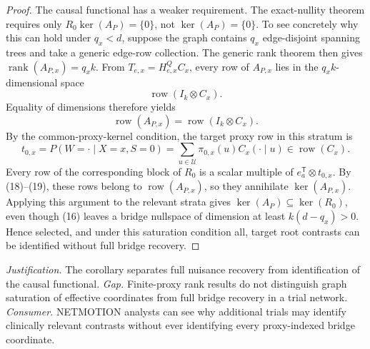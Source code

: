 \documentclass{article}
\begin{document}
\begin{proof}
The causal functional has a weaker requirement.  The exact-nullity theorem requires only \(R_0\ker(A_P)=\{0\}\), not \(\ker(A_P)=\{0\}\).  To see concretely why this can hold under \(q_x<d\), suppose the graph contains \(q_x\) edge-disjoint spanning trees and take a generic edge-row collection.  The generic rank theorem then gives \(\operatorname{rank}(A_{P,x})=q_xk\).  From \(T_{e,x}=H^Q_{e,x}C_x\), every row of \(A_{P,x}\) lies in the \(q_xk\)-dimensional space
\[
\operatorname{row}(I_k\otimes C_x).
\]
Equality of dimensions therefore yields
\[
\operatorname{row}(A_{P,x})=\operatorname{row}(I_k\otimes C_x).
\tag{18}
\]
By the common-proxy-kernel condition, the target proxy row in this stratum is
\[
t_{0,x}=P(W=\mathord\cdot\mid X=x,S=0)
=\sum_{u\in\mathcal U}\pi_{0,x}(u)C_x(\mathord\cdot\mid u)
\in\operatorname{row}(C_x).
\tag{19}
\]
Every row of the corresponding block of \(R_0\) is a scalar multiple of \(e_a^{\mathsf T}\otimes t_{0,x}\).  By (18)--(19), these rows belong to \(\operatorname{row}(A_{P,x})\), so they annihilate \(\ker(A_{P,x})\).  Applying this argument to the relevant strata gives \(\ker(A_P)\subseteq\ker(R_0)\), even though (16) leaves a bridge nullspace of dimension at least \(k(d-q_x)>0\).  Hence selected, and under this saturation condition all, target root contrasts can be identified without full bridge recovery.
\end{proof}
\par\smallskip\noindent \textit{Justification.} The corollary separates full nuisance recovery from identification of the causal functional. \textit{Gap.} Finite-proxy rank results do not distinguish graph saturation of effective coordinates from full bridge recovery in a trial network. \textit{Consumer.} NETMOTION analysts can see why additional trials may identify clinically relevant contrasts without ever identifying every proxy-indexed bridge coordinate.
\end{document}
